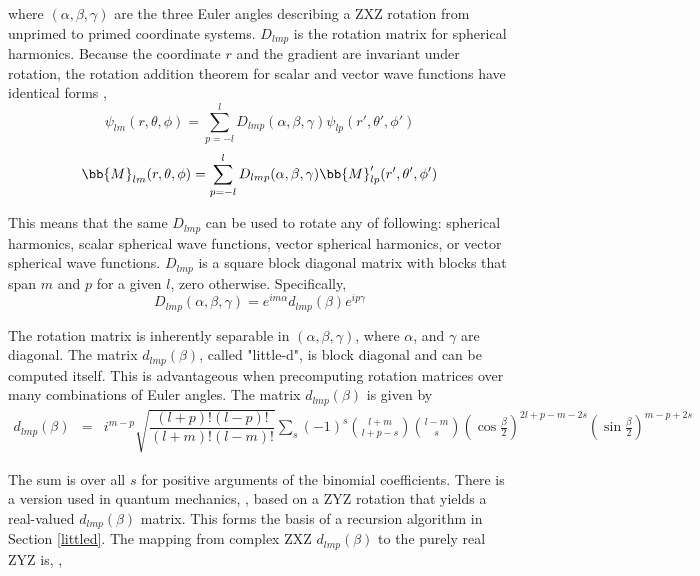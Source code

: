 \noindent where $(\alpha,\beta,\gamma)$ are the three Euler angles describing a ZXZ rotation from unprimed to primed coordinate systems. $D_{lmp}$ is the rotation matrix for spherical harmonics. Because the coordinate $r$ and the gradient are invariant under rotation, the rotation addition theorem for scalar and vector wave functions have identical forms \cite{edmonds1996angular,hansen1988spherical,stein1961addition,dufva2008unified},
\begin{equation}
\psi_{lm}(r,\theta,\phi) = \sum_{p=-l}^{l} D_{lmp}(\alpha,\beta,\gamma) \psi_{lp}(r',\theta',\phi')
\end{equation}
\begin{equation}
\bb{M}_{lm}(r,\theta,\phi) = \sum_{p=-l}^{l} D_{lmp}(\alpha,\beta,\gamma)\bb{M}_{lp}'(r',\theta',\phi')
\end{equation}

This means that the same $D_{lmp}$ can be used to rotate any of following: spherical harmonics, scalar spherical wave functions, vector spherical harmonics, or vector spherical wave functions. $D_{lmp}$ is a square block diagonal matrix with blocks that span $m$ and $p$ for a given $l$, zero otherwise.  Specifically,
\begin{equation}
D_{lmp}(\alpha,\beta,\gamma) = e^{im\alpha}d_{lmp}(\beta)e^{ip\gamma} \label{dlmpsep}
\end{equation}

The rotation matrix is inherently separable in $(\alpha,\beta,\gamma)$, where $\alpha$, and $\gamma$ are diagonal. The matrix $d_{lmp}(\beta)$, called "little-d", is block diagonal and can be computed itself. This is advantageous when precomputing rotation matrices over many combinations of Euler angles. The matrix $d_{lmp}(\beta)$ is given by 
\begin{eqnarray}
d_{lmp}(\beta) &=&  i^{m-p}\sqrt{\dfrac{(l+p)!(l-p)!}{(l+m)!(l-m)!}} \sum_s (-1)^{s}  {l+m \choose l+p-s} {l-m \choose s}  \left(\cos\frac{\beta}{2}\right)^{2l+p-m-2s}\left(\sin\frac{\beta}{2}\right)^{m-p+2s}  \label{dlmpdirect}
\end{eqnarray}


The sum is over all $s$ for positive arguments of the binomial coefficients. There is a version used in quantum mechanics, \cite{wigner2012group}, based on a ZYZ rotation that yields a real-valued $d_{lmp}(\beta)$ matrix. This forms the basis of a recursion algorithm in Section \ref{littled}. The mapping from complex ZXZ  $d_{lmp}(\beta)$ to the purely real ZYZ is, \cite{littledconversion},



